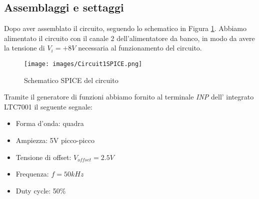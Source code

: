 \subsection{Assemblaggi e settaggi}
Dopo aver assemblato il circuito, seguendo lo schematico in Figura \ref{fig:Circuit1SPICE}. Abbiamo alimentato il circuito con il canale 2 dell'alimentatore da banco, in modo da avere la tensione di $V_i=+8V$ necessaria al funzionamento del circuito.
\begin{figure}[H]
    \centering
    \texttt{[image: images/Circuit1SPICE.png]}
    \caption{Schematico SPICE del circuito}
    \label{fig:Circuit1SPICE}
\end{figure}
Tramite il generatore di funzioni abbiamo fornito al terminale \textit{INP} dell' integrato LTC7001 il seguente segnale:
\begin{itemize}
    \item Forma d'onda: quadra
    \item Ampiezza: 5V picco-picco
    \item Tensione di offset: $V_{offset}=2.5V$
    \item Frequenza: $f=50kHz$
    \item Duty cycle: 50\%
\end{itemize}
\clearpage
